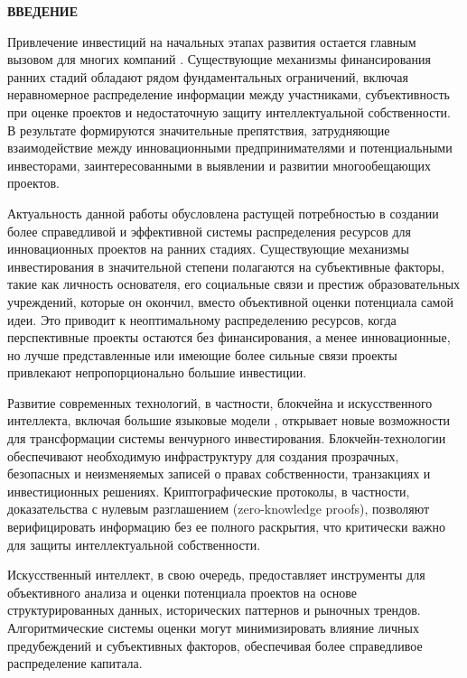 \documentclass[
    14pt,
    specialist,
    candidate, %
    subf, %
    href,
    times,
    dotsinheaders=false,
    colorlinks=false
]{disser}
\newcommand{\myunnumberedchapter}[1]{%
  \newpage
  \hypertarget{chap:#1}{}%
  \begin{center}
    \textbf{\MakeUppercase{#1}}
  \end{center}
  \addcontentsline{toc}{chapter}{\texorpdfstring{#1}{#1}}%
}
\begin{document}
\sloppy



\renewcommand{\contentsname}{\centerline{\normalsize\bfseries\centerline{\textbf{\MakeUppercase{СОДЕРЖАНИЕ}}}}}
\setcounter{tocdepth}{1}

\tableofcontents

\myunnumberedchapter{ВВЕДЕНИЕ}

Привлечение инвестиций на начальных этапах развития остается главным вызовом для многих компаний \cite{bernstein2017attracting}. Существующие механизмы финансирования ранних стадий обладают рядом фундаментальных ограничений, включая неравномерное распределение информации между участниками, субъективность при оценке проектов и недостаточную защиту интеллектуальной собственности. В результате формируются значительные препятствия, затрудняющие взаимодействие между инновационными предпринимателями и потенциальными инвесторами, заинтересованными в выявлении и развитии многообещающих проектов.


Актуальность данной работы обусловлена растущей потребностью в создании более справедливой и эффективной системы распределения ресурсов для инновационных проектов на ранних стадиях. Существующие механизмы инвестирования в значительной степени полагаются на субъективные факторы, такие как личность основателя, его социальные связи и престиж образовательных учреждений, которые он окончил, вместо объективной оценки потенциала самой идеи. Это приводит к неоптимальному распределению ресурсов, когда перспективные проекты остаются без финансирования, а менее инновационные, но лучше представленные или имеющие более сильные связи проекты привлекают непропорционально большие инвестиции.


Развитие современных технологий, в частности, блокчейна \cite{nakamoto2008bitcoin} и искусственного интеллекта, включая большие языковые модели \cite{vaswani2017attention},  открывает новые возможности для трансформации системы венчурного инвестирования. Блокчейн-технологии обеспечивают необходимую инфраструктуру для создания прозрачных, безопасных и неизменяемых записей о правах собственности, транзакциях и инвестиционных решениях. Криптографические протоколы, в частности, доказательства с нулевым разглашением (zero-knowledge proofs), позволяют верифицировать информацию без ее полного раскрытия, что критически важно для защиты интеллектуальной собственности.

Искусственный интеллект, в свою очередь, предоставляет инструменты для объективного анализа и оценки потенциала проектов на основе структурированных данных, исторических паттернов и рыночных трендов. Алгоритмические системы оценки могут минимизировать влияние личных предубеждений и субъективных факторов, обеспечивая более справедливое распределение капитала.
\end{document}
